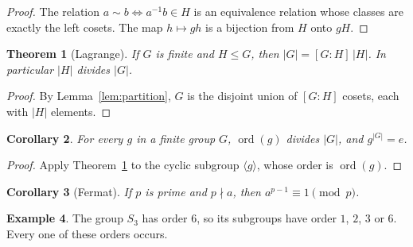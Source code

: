 \documentclass[11pt]{article}
\newtheorem{theorem}{Theorem}[section]
\newtheorem{corollary}[theorem]{Corollary}
\theoremstyle{definition}
\newtheorem{example}[theorem]{Example}
\theoremstyle{remark}
\DeclareMathOperator{\ord}{ord}
\begin{document}
\begin{proof}
The relation $a \sim b \iff a^{-1}b \in H$ is an equivalence relation whose
classes are exactly the left cosets. The map $h \mapsto gh$ is a bijection
from $H$ onto $gH$.
\end{proof}

\begin{theorem}[Lagrange]\label{thm:lagrange}
If $G$ is finite and $H \le G$, then $|G| = [G : H]\,|H|$. In particular
$|H|$ divides $|G|$.
\end{theorem}

\begin{proof}
By Lemma~\ref{lem:partition}, $G$ is the disjoint union of $[G:H]$ cosets,
each with $|H|$ elements.
\end{proof}

\begin{corollary}
For every $g$ in a finite group $G$, $\ord(g)$ divides $|G|$, and
$g^{|G|} = e$.
\end{corollary}

\begin{proof}
Apply Theorem~\ref{thm:lagrange} to the cyclic subgroup
$\langle g \rangle$, whose order is $\ord(g)$.
\end{proof}

\begin{corollary}[Fermat]
If $p$ is prime and $p \nmid a$, then $a^{p-1} \equiv 1 \pmod p$.
\end{corollary}

\begin{example}
The group $S_3$ has order $6$, so its subgroups have order $1$, $2$, $3$ or
$6$. Every one of these orders occurs.
\end{example}
\end{document}
